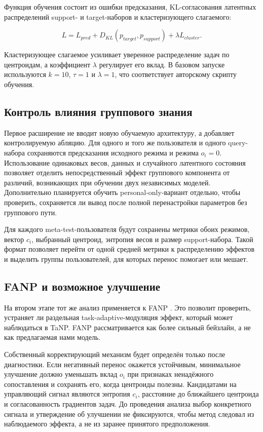 \documentclass[12pt,a4paper]{article}
\begin{document}
Функция обучения состоит из ошибки предсказания, KL-согласования латентных
распределений support- и target-наборов и кластеризующего слагаемого:

\[
L=L_{pred}+D_{KL}(p_{target},p_{support})+\lambda L_{cluster}.
\]

Кластеризующее слагаемое усиливает уверенное распределение задач по
центроидам, а коэффициент $\lambda$ регулирует его вклад. В базовом запуске
используются $k=10$, $\tau=1$ и $\lambda=1$, что соответствует авторскому
скрипту обучения.

\subsection{Контроль влияния группового знания}

Первое расширение не вводит новую обучаемую архитектуру, а добавляет
контролируемую абляцию. Для одного и того же пользователя и одного query-набора
сохраняются предсказания исходного режима и режима $o_i=0$. Использование
одинаковых весов, данных и случайного латентного состояния позволяет отделить
непосредственный эффект группового компонента от различий, возникающих при
обучении двух независимых моделей. Дополнительно планируется обучить
personal-only-вариант отдельно, чтобы проверить, сохраняется ли вывод после
полной перенастройки параметров без группового пути.

Для каждого meta-test-пользователя будут сохранены метрики обоих режимов,
вектор $c_i$, выбранный центроид, энтропия весов и размер support-набора. Такой
формат позволяет перейти от одной средней метрики к распределению эффектов и
выделить группы пользователей, для которых перенос помогает или мешает.

\subsection{FANP и возможное улучшение}

На втором этапе тот же анализ применяется к FANP \citep{lin2024fanp}. Это
позволит проверить, устраняет ли раздельная task-adaptive-модуляция эффект,
который может наблюдаться в TaNP. FANP рассматривается как более сильный
бейзлайн, а не как предлагаемая нами модель.

Собственный корректирующий механизм будет определён только после диагностики.
Если негативный перенос окажется устойчивым, минимальное улучшение должно
уменьшать вклад $o_i$ при признаках ненадёжного сопоставления и сохранять его,
когда центроиды полезны. Кандидатами на управляющий сигнал являются энтропия
$c_i$, расстояние до ближайшего центроида и согласованность градиентов задач.
До проведения анализа выбор конкретного сигнала и утверждение об улучшении не
фиксируются, чтобы метод следовал из наблюдаемого эффекта, а не из заранее
принятого предположения.
\end{document}
